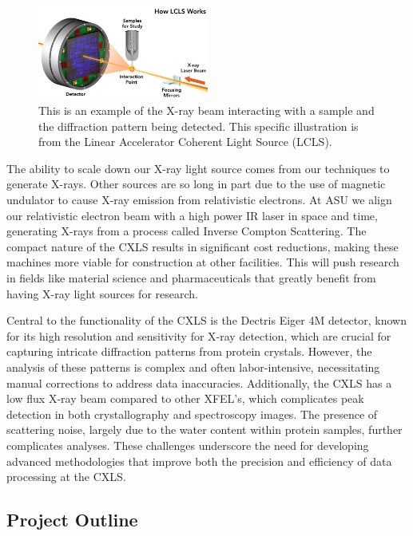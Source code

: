 \documentclass[12pt]{article}
\begin{document}
\begin{figure}
    \centering
    \includegraphics[width=0.5\textwidth]{lcls}
    \caption{This is an example of the X-ray beam interacting with a sample and the diffraction pattern being detected. This specific illustration is from the Linear Accelerator Coherent Light Source (LCLS). \cite{lcls_diagram}}
    \label{fig:lcls}
\end{figure}

The ability to scale down our X-ray light source comes from our techniques to generate X-rays. Other sources are so long in part due to the use of magnetic undulator to cause X-ray emission from relativistic electrons. At ASU we align our relativistic electron beam with a high power IR laser in space and time, generating X-rays from a process called Inverse Compton Scattering. The compact nature of the CXLS results in significant cost reductions, making these machines more viable for construction at other facilities. This will push research in fields like material science and pharmaceuticals that greatly benefit from having X-ray light sources for research.

Central to the functionality of the CXLS is the Dectris Eiger 4M detector, known for its high resolution and sensitivity for X-ray detection, which are crucial for capturing intricate diffraction patterns from protein crystals. However, the analysis of these patterns is complex and often labor-intensive, necessitating manual corrections to address data inaccuracies. Additionally, the CXLS has a low flux X-ray beam compared to other XFEL's, which complicates peak detection in both crystallography and spectroscopy images. The presence of scattering noise, largely due to the water content within protein samples, further complicates analyses. These challenges underscore the need for developing advanced methodologies that improve both the precision and efficiency of data processing at the CXLS.

\subsection{Project Outline}
\end{document}
